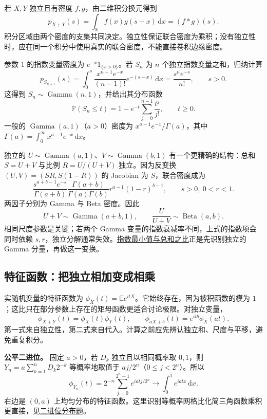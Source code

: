 \label{app:probability-convolution}

若 $X,Y$ 独立且有密度 $f,g$，由二维积分换元得到
\[
p_{X+Y}(s)=\int_{\mathbb R}f(x)g(s-x)\,\mathrm dx=(f*g)(s).
\]
积分区域由两个密度的支集共同决定。独立性保证联合密度为乘积；没有独立性时，应在同一个积分中使用真实的联合密度，不能直接卷积边缘密度。

参数 $1$ 的指数变量密度为 $e^{-x}1_{\{x>0\}}$。若 $S_n$ 为 $n$ 个独立指数变量之和，归纳计算
\[
p_{S_{n+1}}(s)=\int_0^s\frac{x^{n-1}e^{-x}}{(n-1)!}e^{-(s-x)}\,\mathrm dx
=\frac{s^ne^{-s}}{n!},\qquad s>0.
\]
这得到 $S_n\sim\operatorname{Gamma}(n,1)$，并给出其分布函数
\[
\mathbb P(S_n\le t)=1-e^{-t}\sum_{j=0}^{n-1}\frac{t^j}{j!},\qquad t\ge0.
\]
一般的 $\operatorname{Gamma}(a,1)$（$a>0$）密度为 $x^{a-1}e^{-x}/\Gamma(a)$，其中 $\Gamma(a)=\int_0^\infty x^{a-1}e^{-x}\,\mathrm dx$。

独立的 $U\sim\operatorname{Gamma}(a,1)$、$V\sim\operatorname{Gamma}(b,1)$ 有一个更精确的结构：总和 $S=U+V$ 与比例 $R=U/(U+V)$ 独立。因为反变换 $(U,V)=(SR,S(1-R))$ 的 Jacobian 为 $S$，联合密度成为
\[
\frac{s^{a+b-1}e^{-s}}{\Gamma(a+b)}
\frac{\Gamma(a+b)}{\Gamma(a)\Gamma(b)}r^{a-1}(1-r)^{b-1},
\qquad s>0,\ 0<r<1.
\]
两因子分别为 Gamma 与 Beta 密度。因此
\[
U+V\sim\operatorname{Gamma}(a+b,1),\qquad
\frac U{U+V}\sim\operatorname{Beta}(a,b).
\]
相同尺度参数是关键；若两个 Gamma 变量的指数衰减率不同，上式的指数项会同时依赖 $s,r$，独立分解通常失效。\hyperref[pr:fin16-high:12]{指数最小值与总和之比}正是先识别独立的 Gamma 分量，再做这一变换。

\subsection{特征函数：把独立相加变成相乘}

\label{app:probability-characteristic}

实随机变量的特征函数为 $\phi_X(t)=\mathbb Ee^{itX}$。它始终存在，因为被积函数的模为 $1$；这比只在部分参数上存在的矩母函数更适合讨论极限。对独立变量，
\[
\phi_{X+Y}(t)=\phi_X(t)\phi_Y(t),\qquad
\phi_{aX+b}(t)=e^{itb}\phi_X(at).
\]
第一式来自独立性，第二式来自代入。计算之前应先辨认独立和、尺度与平移，避免重复积分。

\textbf{公平二进位。} 固定 $a>0$，若 $D_k$ 独立且以相同概率取 $0,1$，则 $Y_n=a\sum_{k=1}^nD_k2^{-k}$ 等概率地取值于 $a j/2^n$（$0\le j<2^n$）。所以
\[
\phi_{Y_n}(t)=2^{-n}\sum_{j=0}^{2^n-1}e^{iatj/2^n}
\longrightarrow\int_0^1e^{iatx}\,\mathrm dx.
\]
右边是 $(0,a)$ 上均匀分布的特征函数。这里识别等概率网格比化简三角函数乘积更直接，见\hyperref[pr:fin08-hi:13]{二进位分布题}。

